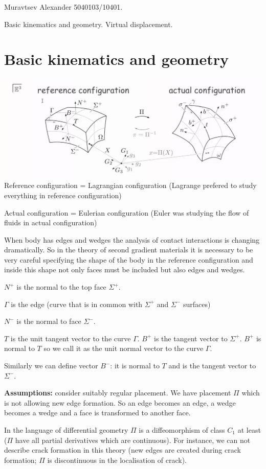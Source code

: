 \documentclass[a4paper,12pt]{article}
\begin{document}
Muravtsev Alexander 5040103/10401.

Basic kinematics and geometry. Virtual displacement.
\section{Basic kinematics and geometry}
\includegraphics[width=\textwidth]{ReferenceActualConfigurations}
Reference configuration = Lagrangian configuration (Lagrange prefered to study everything in reference configuration)

Actual configuration = Eulerian configuration (Euler was studying the flow of fluids in actual configuration)

When body has edges and wedges the analysis of contact interactions is changing dramatically. So in the theory of second gradient materials it is necessary to be very careful specifying the shape of the body in the reference configuration and inside this shape not only faces must be included but also edges and wedges.

$N^+$ is the normal to the top face $\Sigma^+$.

$\Gamma$ is the edge (curve that is in common with $\Sigma^+$ and $\Sigma^-$ surfaces)

$N^-$ is the normal to face $\Sigma^-$.

$T$ is the unit tangent vector to the curve $\Gamma$. $B^+$ is the tangent vector to $\Sigma^+$. $B^+$ is normal to $T$ so we call it as the unit normal vector to the curve $\Gamma$. 

Similarly we can define vector $B^-$: it is normal to $T$ and is the tangent vector to $\Sigma^-$.

\textbf{Assumptions:} consider suitably regular placement. We have placement $\Pi$ which is not allowing new edge formation. So an edge becomes an edge, a wedge becomes a wedge and a face is transformed to another face.

In the language of differential geometry $\Pi$ is a diffeomorphism of class $C_1$ at least ($\Pi$ have all partial derivatives which are continuous). For instance, we can not describe crack formation in this theory (new edges are created during crack formation; $\Pi$ is discontinuous in the localisation of crack).
\end{document}
